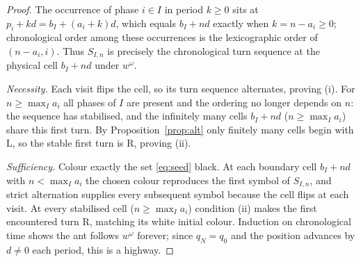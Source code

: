 \documentclass[11pt,letterpaper]{article}
\theoremstyle{plain}
\theoremstyle{definition}
\newcommand{\drift}{d}
\newcommand{\turnR}{\mathrm{R}}
\newcommand{\turnL}{\mathrm{L}}
\begin{document}
\begin{NoHyper}
\begin{proof}
The occurrence of phase $i\in I$ in period $k\ge0$ sits at
$p_i+k\drift=b_I+(a_i+k)\drift$, which equals $b_I+n\drift$ exactly when $k=n-a_i\ge0$;
chronological order among these occurrences is the lexicographic order of $(n-a_i,i)$.
Thus $S_{I,n}$ is precisely the chronological turn sequence at the physical cell
$b_I+n\drift$ under $w^\omega$.

\emph{Necessity.} Each visit flips the cell, so its turn sequence alternates,
proving (i). For $n\ge\max_I a_i$ all phases of $I$ are present and the ordering no
longer depends on $n$: the sequence has stabilised, and the infinitely many cells
$b_I+n\drift$ ($n\ge\max_I a_i$) share this first turn. By Proposition~\ref{prop:alt}
only finitely many cells begin with $\turnL$, so the stable first turn is $\turnR$,
proving (ii).

\emph{Sufficiency.} Colour exactly the set \eqref{eq:seed} black. At each boundary
cell $b_I+n\drift$ with $n<\max_I a_i$ the chosen colour reproduces the first symbol
of $S_{I,n}$, and strict alternation supplies every subsequent symbol because the
cell flips at each visit. At every stabilised cell ($n\ge\max_I a_i$) condition (ii)
makes the first encountered turn $\turnR$, matching its white initial colour.
Induction on chronological time shows the ant follows $w^\omega$ forever; since
$q_N=q_0$ and the position advances by $\drift\neq0$ each period, this is a highway.
\end{proof}


\end{NoHyper}
\end{document}
